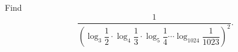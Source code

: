 Find
\[\dfrac{1}{\left(\log_3\dfrac12\cdot\log_4\dfrac13\cdot\log_5\dfrac14\cdots\log_{1024}\dfrac1{1023}\right)^2}.\]
